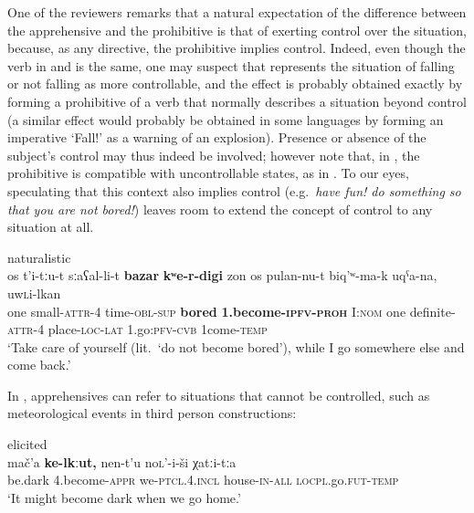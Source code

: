 \documentclass[output=paper,colorlinks,citecolor=brown]{langscibook}
\begin{document}
One of the reviewers remarks that a natural expectation of the difference between the apprehensive and the prohibitive is that of exerting control over the situation, because, as any directive, the prohibitive implies control. Indeed, even though the verb in  and  is the same, one may suspect that  represents the situation of falling or not falling as more controllable, and the effect is probably obtained exactly by forming a prohibitive of a verb that normally describes a situation beyond control (a similar effect would probably be obtained in some languages by forming an imperative `Fall!' as a warning of an explosion).  Presence or absence of the subject's control may thus indeed be involved; however note that, in , the prohibitive is compatible with uncontrollable states, as in . To our eyes, speculating that this context also implies control (e.g.\ \textit{have fun! do something so that you are not bored!}) leaves room to extend the concept of control to any situation at all.


\ea \label{ex:DD7} \textnormal{naturalistic}\\
\gll os t'i-tːu-t sːaʕal-li-t \textbf{bazar} \textbf{kʷe-r-digi} zon os pulan-nu-t biq'ʷ-ma-k uqˁa-na, u{\textlangle}w{\textrangle}\textsc{l}i-lkan\\
one small-\textsc{attr}-4 time-\textsc{obl-sup} \textbf{bored} \textbf{1.become-\textsc{ipfv-proh}} I:\textsc{nom} one definite-\textsc{attr}-4 place-\textsc{loc-lat} 1.go:\textsc{pfv-cvb} {\textlangle}1{\textrangle}come-\textsc{temp}\\
\glt `Take care of yourself (lit.\ `do not become bored'), while I go somewhere else and come back.'
\z

 In , apprehensives can refer to situations that cannot be controlled, such as meteorological events in third person constructions:

  \begin{exe}\ex \label{ex:DD8} \textnormal{elicited}\\
{\gll mač'a \textbf{ke-lkːut,} nen-t'u no\textsc{l}'-i-ši χatːi-tːa\\
be.dark 4.become-\textsc{appr} we-\textsc{ptcl.4.incl} house-\textsc{in-all} \textsc{locpl}.go.\textsc{fut-temp}\\\glt `It might become dark when we go home.'}
\end{exe}
\end{document}
